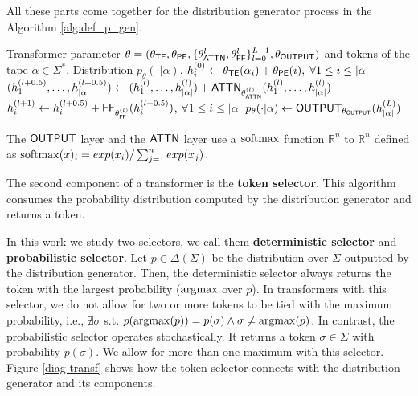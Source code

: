 All these parts come together for the distribution generator process in the Algorithm \ref{alg:def_p_gen}.

\begin{algorithm}
\caption{Distribution generator}\label{alg:def_p_gen}
\begin{algorithmic}[1]
\Input Transformer parameter $\theta = (\theta_{\mathsf{TE}}, \theta_{\mathsf{PE}}, \{\theta_{\mathsf{ATTN}}^{l}, \theta_{\mathsf{FF}}^{l}\}_{l=0}^{L-1}, \theta_{\mathsf{OUTPUT}})$ and tokens of the tape $\alpha \in \Sigma^*$.
\Output Distribution $p_\theta(\cdot | \alpha)$.
\State $h^{(0)}_i \gets \theta_{\mathsf{TE}}(\alpha_i) + \theta_{\mathsf{PE}}(i), \; \forall 1 \leq i \leq |\alpha|$
\State	$( h^{(l+0.5)}_1,\ldots, h^{(l+0.5)}_{|\alpha|}) \gets (h^{(l)}_1,\ldots, h^{(l)}_{|\alpha|}) +\mathsf{ATTN}_{\theta^{(l)}_{\mathsf{ATTN}}}(h^{(l)}_1,\ldots, h^{(l)}_{|\alpha|}) $
\State  $ h^{(l+1)}_i \gets  h^{(l+0.5)}_i + \mathsf{FF}_{\theta^{(l)}_{\mathsf{FF}}}(h^{(l+0.5)}_i)$, $\forall 1 \leq i \leq |\alpha|$
\EndFor
\State $p_\theta(\cdot| \alpha) \gets  \mathsf{OUTPUT}_{\theta_{\mathsf{OUTPUT}}}(h^{(L)}_{|\alpha|})$
\end{algorithmic}
\end{algorithm}

The $\mathsf{OUTPUT}$ layer and the $\mathsf{ATTN}$ layer use a $\mathrm{softmax}$ function $\mathbb{R}^n$ to $\mathbb{R}^n$ defined as $\mathrm{softmax}(x)_i = exp(x_i) / \sum_{j=1}^n exp(x_j)$.

\smallskip


The second component of a transformer is the \textbf{token selector}.
This algorithm consumes the probability distribution computed by the distribution generator and returns a token.

In this work we study two selectors, we call them \textbf{deterministic selector} and \textbf{probabilistic selector}.
Let $p \in \Delta(\Sigma)$ be the distribution over $\Sigma$ outputted by the distribution generator.
Then, the deterministic selector always returns the token with the largest probability ($\mathrm{argmax}$ over $p$).
In transformers with this selector, we do not allow for two or more tokens to be tied with the maximum probability, i.e., $\nexists \sigma$ s.t. $p(\mathrm{argmax}(p)) = p(\sigma) \land \sigma \neq \mathrm{argmax}(p)$.
In contrast, the probabilistic selector operates stochastically.
It returns a token $\sigma \in \Sigma$ with probability $p(\sigma)$.
We allow for more than one maximum with this selector. Figure \ref{diag-transf} shows how the token selector connects with the distribution generator and its components.


